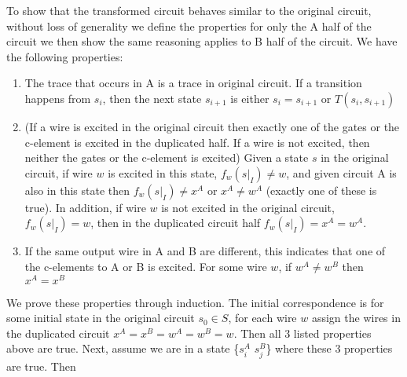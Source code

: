 \documentclass{article}
\begin{document}
To show that the transformed circuit behaves similar to the original circuit, without loss of generality we define the properties for only the A half of the circuit we then show the same reasoning applies to B half of the circuit.  We have the following properties:
\begin{enumerate} %
\item  The trace that occurs in A is a trace in original circuit.  If a transition happens from $s_i$, then the next state $s_{i+1}$ is either $s_i=s_{i+1}$ or $T(s_i,s_{i+1})$  %
\item  (If a wire is excited in the original circuit then exactly one of the gates or the c-element is excited in the duplicated half.  If a wire is not excited, then neither the gates or the c-element is excited) Given a state $s$ in the original circuit, if wire $w$ is excited in this state, $f_w(s|_I)\neq w$, and given circuit A is also in this state then $f_w(s|_I) \neq x^A$ or $x^A \neq w^A$ (exactly one of these is true).  
In addition, if wire $w$ is not excited in the original circuit, $f_w(s|_I)=w$, then in the duplicated circuit half $f_w(s|_I)=x^A=w^A$.  %
\item  If the same output wire in A and B are different, this indicates that one of the c-elements to A or B is excited.  For some wire $w$, if $w^A\neq w^B$ then $x^A=x^B$ 
\end{enumerate}
We prove these properties through induction.  The initial correspondence is for some initial state in the original circuit $s_0 \in S$, for each wire $w$ assign the wires in the duplicated circuit $x^A=x^B=w^A=w^B=w$.  Then all 3 listed properties above are true.  
Next, assume we are in a state \{$s_i^A$ $s_j^B$\} where these 3 properties are true.  Then 
\end{document}
